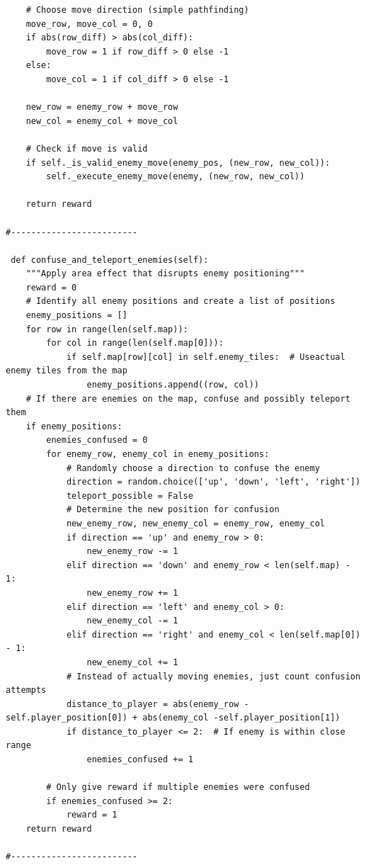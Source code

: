 \documentclass{article} %
\begin{document}
\begin{lstlisting}
    # Choose move direction (simple pathfinding)
    move_row, move_col = 0, 0
    if abs(row_diff) > abs(col_diff):
        move_row = 1 if row_diff > 0 else -1
    else:
        move_col = 1 if col_diff > 0 else -1
    
    new_row = enemy_row + move_row
    new_col = enemy_col + move_col
    
    # Check if move is valid
    if self._is_valid_enemy_move(enemy_pos, (new_row, new_col)):
        self._execute_enemy_move(enemy, (new_row, new_col))
    
    return reward

#-------------------------

 def confuse_and_teleport_enemies(self):
    """Apply area effect that disrupts enemy positioning"""
    reward = 0
    # Identify all enemy positions and create a list of positions
    enemy_positions = []
    for row in range(len(self.map)):
        for col in range(len(self.map[0])):
            if self.map[row][col] in self.enemy_tiles:  # Useactual enemy tiles from the map
                enemy_positions.append((row, col))
    # If there are enemies on the map, confuse and possibly teleport them
    if enemy_positions:
        enemies_confused = 0
        for enemy_row, enemy_col in enemy_positions:
            # Randomly choose a direction to confuse the enemy
            direction = random.choice(['up', 'down', 'left', 'right'])
            teleport_possible = False
            # Determine the new position for confusion
            new_enemy_row, new_enemy_col = enemy_row, enemy_col
            if direction == 'up' and enemy_row > 0:
                new_enemy_row -= 1
            elif direction == 'down' and enemy_row < len(self.map) - 1:
                new_enemy_row += 1
            elif direction == 'left' and enemy_col > 0:
                new_enemy_col -= 1
            elif direction == 'right' and enemy_col < len(self.map[0]) - 1:
                new_enemy_col += 1
            # Instead of actually moving enemies, just count confusion attempts
            distance_to_player = abs(enemy_row -self.player_position[0]) + abs(enemy_col -self.player_position[1])
            if distance_to_player <= 2:  # If enemy is within close range
                enemies_confused += 1
        
        # Only give reward if multiple enemies were confused
        if enemies_confused >= 2:
            reward = 1
    return reward   

#-------------------------


\end{lstlisting}
\end{document}
